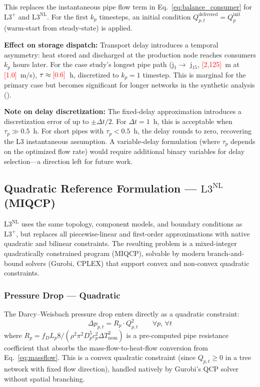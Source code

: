 \documentclass[review,3p]{elsarticle}
\newcommand{\placeholder}[1]{\textcolor{red}{[#1]}}
\newcommand{\Lplus}{\mathrm{L3}^{+}}
\newcommand{\Lnl}{\mathrm{L3}^{\mathrm{NL}}}
\begin{document}
This replaces the instantaneous pipe flow term in
Eq.~\eqref{eq:balance_consumer} for $\Lplus$ and $\Lnl$. For the
first $k_p$ timesteps, an initial condition
$Q_{p,t}^{\mathrm{delivered}} = Q_p^{\mathrm{init}}$ (warm-start
from steady-state) is applied.

\textbf{Effect on storage dispatch:} Transport delay introduces
a temporal asymmetry: heat stored and discharged at the production
node reaches consumers $k_p$ hours later. For the case study's
longest pipe path (j$_1 \to$ j$_{15}$, \placeholder{2,125}~m at
\placeholder{1.0}~m/s), $\tau \approx \placeholder{0.6}$~h,
discretized to $k_p = 1$ timestep. This is marginal for the
primary case but becomes significant for longer networks in the
synthetic analysis ().

\textbf{Note on delay discretization:} The fixed-delay
approximation introduces a discretization error of up to
$\pm \Delta t / 2$. For $\Delta t = 1$~h, this is acceptable when
$\tau_p \gg 0.5$~h. For short pipes with $\tau_p < 0.5$~h, the
delay rounds to zero, recovering the L3 instantaneous assumption.
A variable-delay formulation (where $\tau_p$ depends on the
optimized flow rate) would require additional binary variables for
delay selection---a direction left for future work.

\subsection{Quadratic Reference Formulation --- $\Lnl$ (MIQCP)}
\label{sec:miqcp}

$\Lnl$ uses the same topology, component models, and boundary
conditions as $\Lplus$, but replaces all piecewise-linear and
first-order approximations with native quadratic and bilinear
constraints. The resulting problem is a mixed-integer quadratically
constrained program (MIQCP), solvable by modern branch-and-bound
solvers (Gurobi, CPLEX) that support convex and non-convex
quadratic constraints.

\subsubsection{Pressure Drop --- Quadratic}

The Darcy--Weisbach pressure drop enters directly as a quadratic
constraint:
\begin{equation}
\Delta p_{p,t} = R_p \cdot Q_{p,t}^2
\qquad \forall p,\, \forall t
\label{eq:darcy_quad}
\end{equation}
where $R_p = f_D L_p 8 / (\rho^2 \pi^2 D_p^5 c_p^2
\Delta T_{\mathrm{nom}}^2)$ is a pre-computed pipe resistance
coefficient that absorbs the mass-flow-to-heat-flow conversion
from Eq.~\eqref{eq:massflow}. This is a convex quadratic
constraint (since $Q_{p,t} \geq 0$ in a tree network with fixed
flow direction), handled natively by Gurobi's QCP solver without
spatial branching.
\end{document}
